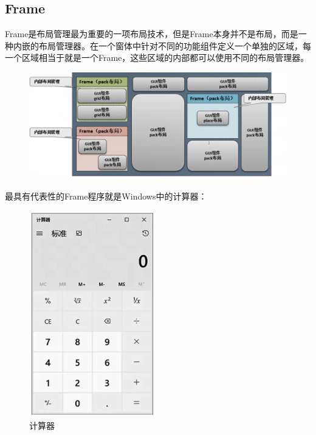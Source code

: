\vspace{0.5cm}

\subsection{Frame}

Frame是布局管理最为重要的一项布局技术，但是Frame本身并不是布局，而是一种内嵌的布局管理器。在一个窗体中针对不同的功能组件定义一个单独的区域，每一个区域相当于就是一个Frame，这些区域的内部都可以使用不同的布局管理器。

\begin{figure}[H]
	\centering
	\includegraphics[scale=0.6]{img/C13/13-3/5.png}
\end{figure}

最具有代表性的Frame程序就是Windows中的计算器：

\begin{figure}[H]
	\centering
	\includegraphics[scale=1.2]{img/C13/13-3/6.png}
	\caption{计算器}
\end{figure}

\vspace{0.5cm}


